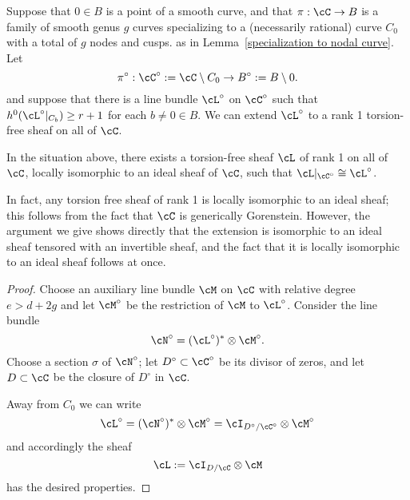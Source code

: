 

Suppose that $0\in B$ is a point of a smooth curve, and that  $\pi : \cC \to B$ is a family of smooth genus $g$ curves specializing to a (necessarily rational) curve $C_0$ with a total of $g$  nodes and cusps. as in Lemma~\ref{specialization to nodal curve}. 
 Let 
$$
\pi^\circ: \cC^\circ := \cC \setminus C_0\to B^\circ := B\setminus 0.
$$
and suppose that there is a line bundle $\cL^\circ$ on $\cC^\circ$ such that $h^0(\cL^\circ|_{C_b}) \geq r+1$ for each $b \neq 0 \in B$. 
We can extend $\cL^\circ$  to a rank 1 torsion-free sheaf on all of $\cC$. 


\begin{lemma}\label{limit sheaf}
In the situation above, there exists a torsion-free sheaf $\cL$ of rank 1 on all of $\cC$, locally isomorphic to
an ideal sheaf of $\cC$, such that $\cL|_{\cC^\circ} \cong \cL^\circ$.
\end{lemma}

In fact, any torsion free sheaf of rank 1 is locally isomorphic
to an ideal sheaf; this follows from the fact that $\cC$ is generically Gorenstein. However, the argument we give 
shows directly that the extension is isomorphic to an ideal sheaf tensored with an invertible sheaf, and the fact that
it is locally isomorphic to an ideal sheaf follows at once.

\begin{proof} Choose an auxiliary line bundle $\cM$ on $\cC$ with relative degree $e > d + 2g$ and let $\cM^\circ$ be the restriction of $\cM$ to $\cL^\circ$. Consider the line bundle 
$$
\cN^\circ = (\cL^\circ)^* \otimes \cM^\circ.
$$
Choose a section $\sigma$ of $\cN^\circ$; let $D^\circ \subset \cC^\circ$ be its divisor of zeros, and let $D \subset \cC$ be the closure of $D^\circ$ in $\cC$. 

Away from $C_0$ we can write
$$
\cL^\circ = (\cN^\circ)^* \otimes \cM^\circ = \cI_{D^\circ/\cC^\circ} \otimes \cM^\circ
$$
and accordingly the sheaf
$$
\cL := \cI_{D/\cC} \otimes \cM
$$
has the desired properties. 
\end{proof}

